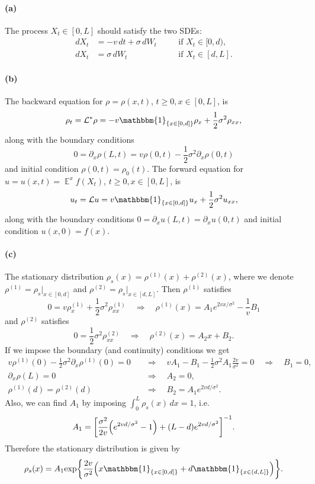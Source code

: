 \documentclass[a4paper,11pt]{article}
\theoremstyle{definition}
\theoremstyle{plain}
\theoremstyle{remark}
\DeclarePairedDelimiter{\parr}{(}{)}
\DeclarePairedDelimiter{\parq}{[}{]}
\DeclarePairedDelimiter{\bra}{\lbrace}{\rbrace}
\DeclareMathOperator*{\expval}{\mathbb{E}}
\begin{document}
\paragraph*{(a)}

The process $X_t\in[0,L]$ should satisfy the two SDEs:
$$
\begin{aligned}
dX_t & = -v\,dt + \sigma\,dW_t \quad && \text{if }X_t \in [0,d),
\\ dX_t & = \sigma\,dW_t  && \text{if }X_t \in [d,L].
\end{aligned}
$$

\paragraph*{(b)}

The backward equation for $\rho = \rho (x,t)$, $t\geq0, x\in[0,L]$, is 
$$
\rho_t = \mathcal{L}^*\rho =  -v\mathbbm{1}_{\bra{x\in[0,d]}}\rho_x + \frac{1}{2}\sigma^2\rho_{xx},
$$
along with the boundary conditions
$$
0 = \partial_x\rho(L,t) = v\rho(0,t) - \frac{1}{2}\sigma^2\partial_x\rho(0,t)
$$
and initial condition $\rho(0,t)=\rho_0(t)$.
The forward equation for $u = u(x,t) = \expval^x f(X_t)$, $t\geq0, x\in[0,L]$, is 
$$
u_t = \mathcal{L}u =  v\mathbbm{1}_{\bra{x\in[0,d]}}u_x + \frac{1}{2}\sigma^2u_{xx},
$$
along with the boundary conditions
$0=\partial_xu(L,t)=\partial_xu(0,t)$ and initial condition $u(x,0)=f(x)$.

\paragraph*{(c)}

The stationary distribution $\rho_s(x)=\rho^{(1)}(x)+\rho^{(2)}(x)$, where we denote $\rho^{(1)} = \rho_s|_{x\in[0,d]}$ and $\rho^{(2)} = \rho_s|_{x\in[d,L]}$. Then
$\rho^{(1)}$ satisfies 
$$
0 = v\rho^{(1)}_x + \frac{1}{2}\sigma^2\rho^{(1)}_{xx} \quad\Rightarrow\quad \rho^{(1)}(x) = A_1e^{2vx/\sigma^2} - \frac{1}{v}B_1
$$
and $\rho^{(2)}$ satisfies
$$
0 = \frac{1}{2}\sigma^2\rho^{(2)}_{xx} \quad\Rightarrow\quad \rho^{(2)}(x) = A_2x+B_2.
$$
If we impose the boundary (and continuity) conditions we get
\begin{align*}
v\rho^{(1)}(0)-\frac{1}{2}\sigma^2\partial_x\rho^{(1)}(0) = 0 & \quad\Rightarrow\quad vA_1 - B_1 -\frac{1}{2}\sigma^2A_1\frac{2v}{\sigma^2} = 0 \quad\Rightarrow\quad B_1 = 0,\\
\partial_x\rho(L) = 0 & \quad\Rightarrow\quad A_2 = 0,\\
\rho^{(1)}(d) = \rho^{(2)}(d) & \quad\Rightarrow\quad B_2 = A_1e^{2vd/\sigma^2}.
\end{align*}
Also, we can find $A_1$ by imposing $\int_0^L\rho_s(x)\,dx= 1$, i.e.
$$
A_1 = \parq*{\frac{\sigma^2}{2v}\parr*{e^{2vd/\sigma^2}-1} + (L-d)e^{2vd/\sigma^2}}^{-1}.
$$
Therefore the stationary distribution is given by
$$
\rho_s(x) = A_1\mathrm{exp}\bra*{\frac{2v}{\sigma^2}\parr*{x\mathbbm{1}_{\bra{x\in[0,d]}}+
d\mathbbm{1}_{\bra{x\in(d,L]}}}}.
$$
\end{document}
